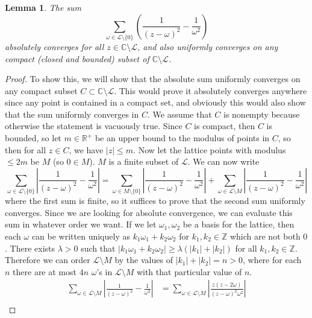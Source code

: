 \documentclass{article}
\newtheorem{lemma}[theorem]{Lemma}
\theoremstyle{definition}
\theoremstyle{definition}
\theoremstyle{definition}
\begin{document}
\begin{lemma}
The sum 
$$\sum_{\omega\in\mathcal{L}\setminus\{0\}}\left(\frac{1}{(z-\omega)^2}-\frac{1}{\omega^2}\right)$$
absolutely converges for all $z\in\mathbb{C}\setminus\mathcal{L}$, and also uniformly converges on any compact (closed and bounded) subset of $\mathbb{C}\setminus\mathcal{L}$.
\end{lemma} 
\begin{proof}
To show this, we will show that the absolute sum uniformly converges on any compact subset $C\subset\mathbb{C}\setminus\mathcal{L}$. This would prove it absolutely converges anywhere since any point is contained in a compact set, and obviously this would also show that the sum uniformly converges in $C$.
\newline\newline
We assume that $C$ is nonempty because otherwise the statement is vacuously true. Since $C$ is compact, then $C$ is bounded, so let $m\in\mathbb R^+$ be an upper bound to the modulus of points in $C$, so then for all $z\in C$, we have $|z|\leq m$. Now let the lattice points with modulus $\leq 2m$ be $M$ (so $0\in M$). $M$ is a finite subset of $\mathcal L$. We can now write
$$\sum_{\omega\in\mathcal{L}\setminus\{0\}}\left|\frac{1}{(z-\omega)^2}-\frac{1}{\omega^2}\right|=\sum_{\omega\in M\setminus\{0\}}\left|\frac{1}{(z-\omega)^2}-\frac{1}{\omega^2}\right|+\sum_{\omega\in\mathcal{L}\setminus M}\left|\frac{1}{(z-\omega)^2}-\frac{1}{\omega^2}\right|$$
where the first sum is finite, so it suffices to prove that the second sum uniformly converges.
\newline\newline
Since we are looking for absolute convergence, we can evaluate this sum in whatever order we want. If we let $\omega_1,\omega_2$ be a basis for the lattice, then each $\omega$ can be written uniquely as $k_1\omega_1+k_2\omega_2$ for $k_1,k_2\in\mathbb Z$ which are not both $0$. There exists $\lambda>0$ such that $|k_1\omega_1+k_2\omega_2|\geq \lambda(|k_1|+|k_2|)$ for all $k_1,k_2\in\mathbb Z$. Therefore we can order $\mathcal{L}\setminus M$ by the values of $|k_1|+|k_2|=n>0$, where for each $n$ there are at most $4n$ $\omega$'s in $\mathcal L\setminus M$ with that particular value of $n$. %
\begin{align*}
\sum_{\omega\in\mathcal{L}\setminus M}\left|\frac{1}{(z-\omega)^2}-\frac{1}{\omega^2}\right|&=\sum_{\omega\in\mathcal{L}\setminus M}\left|\frac{z(z-2\omega)}{(z-\omega)^2\omega^2}\right|\\

\end{align*}
\end{proof}
\end{document}

